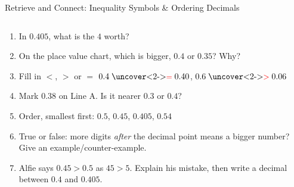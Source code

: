 \documentclass{beamer}
\newcommand{\ashow}[1]{\uncover<2->{\textcolor{red}{\small #1}}}
\begin{document}
\begin{frame}{Retrieve and Connect: Inequality Symbols \& Ordering Decimals}
\begin{columns}[T]
\begin{multicols}{2}
\begin{enumerate}
  \item In $0.405$, what is the $4$ worth? \ashow{$4$ tenths, $0.4$}

  \item On the place value chart, which is bigger, $0.4$ or $0.35$? Why? \ashow{$0.4$: $4$ tenths is greater than $3$ tenths}

  \item Fill in $<$, $>$ or $=$ $0.4 \mathrel{\text{\ashow{$=$}}} 0.40$, $0.6 \mathrel{\text{\ashow{$>$}}} 0.06$

\vspace{0.5em}

  \item Mark $0.38$ on Line A. Is it nearer $0.3$ or $0.4$? \ashow{nearer $0.4$}

  \columnbreak

  \item Order, smallest first: $0.5$, $0.45$, $0.405$, $0.54$ \ashow{$0.405$, $0.45$, $0.5$, $0.54$}

  \vspace{0.2em}

  \item True or false: more digits \emph{after} the decimal point means a bigger number? Give an example/counter-example. \ashow{False: $0.9>0.1234$}

  \vspace{0.2em}

  \item Alfie says $0.45>0.5$ as $45>5$. Explain his mistake, then write a decimal between $0.4$ and $0.405$. \ashow{$0.5$ has $5$ tenths; e.g.\ $0.402$}

\end{enumerate}
\end{multicols}

\end{columns}

\end{frame}
\end{document}

